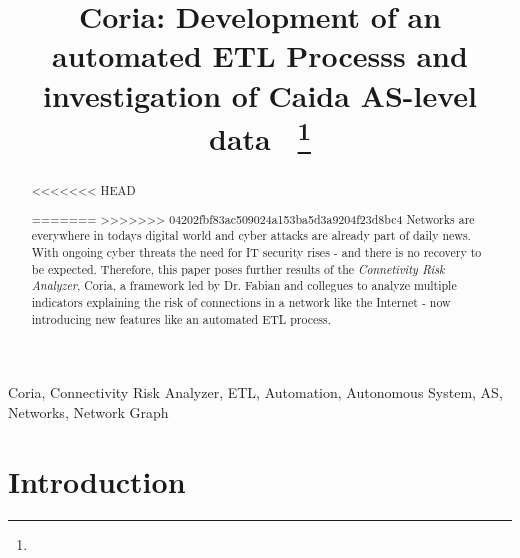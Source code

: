 \documentclass[conference, 11pt]{IEEEtran}
\begin{document}
			  
			  
\title{Coria: Development of an automated ETL Processs and investigation of Caida AS-level data\
{\footnotesize \textsuperscript{}}
\thanks{}
}

\author{
\and
{}
}

\maketitle
\thispagestyle{plain}
\pagestyle{plain}



\begin{abstract}
<<<<<<< HEAD

=======
>>>>>>> 04202fbf83ac509024a153ba5d3a9204f23d8bc4
Networks are everywhere in todays digital world and cyber attacks are already part of daily news. With ongoing cyber threats the need for IT security rises - and there is no recovery to be expected. Therefore, this paper poses further results of the \textit{Connetivity Risk Analyzer}, Coria, a framework led by Dr. Fabian and collegues to analyze multiple indicators explaining the risk of connections in a network like the Internet - now introducing new features like an automated ETL process.

\end{abstract}

\begin{IEEEkeywords}
Coria, Connectivity Risk Analyzer, ETL, Automation, Autonomous System, AS, Networks, Network Graph
\end{IEEEkeywords}


\section{Introduction}
\end{document}
